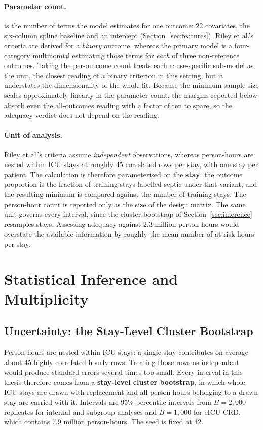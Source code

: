 \paragraph{Parameter count.}
\pcNCandidatePredictors{} is the number of terms the model estimates for one
outcome: 22 covariates, the six-column spline baseline and an intercept
(Section~\ref{sec:features}). Riley et al.'s criteria are derived for a
\emph{binary} outcome, whereas the primary model is a four-category multinomial
estimating those terms for \emph{each} of three non-reference outcomes. Taking
the per-outcome count treats each cause-specific sub-model as the unit, the
closest reading of a binary criterion in this setting, but it understates the
dimensionality of the whole fit. Because the minimum sample size scales
approximately linearly in the parameter count, the margins reported below
absorb even the all-outcomes reading with a factor of ten to spare, so the
adequacy verdict does not depend on the reading.

\paragraph{Unit of analysis.} Riley et al.'s criteria assume
\emph{independent} observations, whereas person-hours are nested within ICU
stays at roughly 45 correlated rows per stay, with one stay per patient. The
calculation is therefore parameterised on the \textbf{stay}: the outcome
proportion is the fraction of training stays labelled septic under that
variant, and the resulting minimum is compared against the number of training
stays. The person-hour count is reported only as the size of the design matrix.
The same unit governs every interval, since the cluster bootstrap of
Section~\ref{sec:inference} resamples stays. Assessing adequacy against 2.3
million person-hours would overstate the available information by roughly the
mean number of at-risk hours per stay.


\section{Statistical Inference and Multiplicity}
\label{sec:multiplicity}
\label{sec:inference}

\subsection{Uncertainty: the Stay-Level Cluster Bootstrap}

Person-hours are nested within ICU stays: a single stay contributes on average
about 45 highly correlated hourly rows. Treating those rows as independent
would produce standard errors several times too small. Every interval in this
thesis therefore comes from a \textbf{stay-level cluster bootstrap}, in which
whole ICU stays are drawn with replacement and all person-hours belonging to a
drawn stay are carried with it. Intervals are 95\% percentile intervals from
$B = 2{,}000$ replicates for internal and subgroup analyses and $B = 1{,}000$
for eICU-CRD, which contains 7.9 million person-hours. The seed is fixed at 42.

